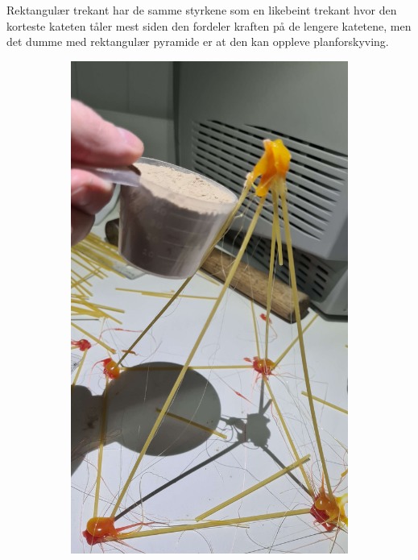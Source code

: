 \documentclass{report}
\newcommand{\subimgw}{.5\linewidth}
\begin{document}
Rektangulær trekant har de samme styrkene som en likebeint trekant hvor den korteste kateten tåler mest siden den fordeler kraften på de lengere katetene, men det dumme med rektangulær pyramide er at den kan oppleve planforskyving.

\begin{figure}[H]
	\begin{subfigure}{.5\textwidth}
		\centering
		\includegraphics[width=\subimgw]{pyramid-a}


\end{subfigure}
\end{figure}
\end{document}
